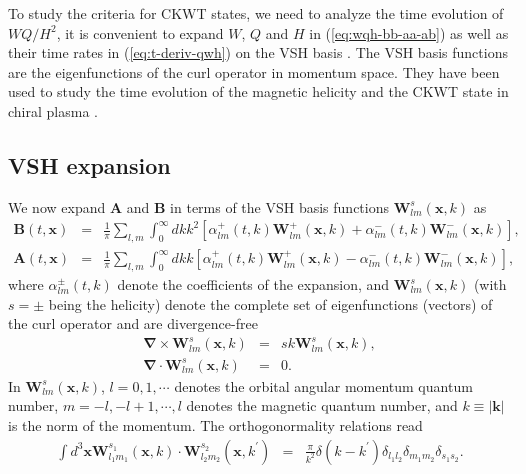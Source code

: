 \documentclass[english,aps,superscriptaddress,preprint]{revtex4-1}
\begin{document}
\label{sec:Methods}To study the criteria for CKWT states, we need
to analyze the time evolution of $WQ/H^{2}$, it is convenient to
expand $W$, $Q$ and $H$ in (\ref{eq:wqh-bb-aa-ab}) as well as
their time rates in (\ref{eq:t-deriv-qwh}) on the VSH basis \citep{Jackson1999}.
The VSH basis functions are the eigenfunctions of the curl operator
in momentum space. They have been used to study the time evolution
of the magnetic helicity and the CKWT state in chiral plasma \citep{Hirono:2015rla,Xia:2016any}.

\subsection{VSH expansion}

We now expand $\boldsymbol{A}$ and $\boldsymbol{B}$ in terms of
the VSH basis functions $\boldsymbol{W}_{lm}^{s}(\boldsymbol{x},k)$
as 
\begin{eqnarray}
\boldsymbol{B}(t,\boldsymbol{x}) & = & \frac{1}{\pi}\sum_{l,m}\int_{0}^{\infty}dkk^{2}\left[\alpha_{lm}^{+}(t,k)\boldsymbol{W}_{lm}^{+}(\boldsymbol{x},k)+\alpha_{lm}^{-}(t,k)\boldsymbol{W}_{lm}^{-}(\boldsymbol{x},k)\right],\nonumber \\
\boldsymbol{A}(t,\boldsymbol{x}) & = & \frac{1}{\pi}\sum_{l,m}\int_{0}^{\infty}dkk\left[\alpha_{lm}^{+}(t,k)\boldsymbol{W}_{lm}^{+}(\boldsymbol{x},k)-\alpha_{lm}^{-}(t,k)\boldsymbol{W}_{lm}^{-}(\boldsymbol{x},k)\right],\label{eq:VSH-expansion}
\end{eqnarray}
where $\alpha_{lm}^{\pm}(t,k)$ denote the coefficients of the expansion,
and $\boldsymbol{W}_{lm}^{s}(\boldsymbol{x},k)$ (with $s=\pm$ being
the helicity) denote the complete set of eigenfunctions (vectors)
of the curl operator and are divergence-free 
\begin{eqnarray}
\boldsymbol{\nabla}\times\boldsymbol{W}_{lm}^{s}(\boldsymbol{x},k) & = & sk\boldsymbol{W}_{lm}^{s}(\boldsymbol{x},k),\nonumber \\
\boldsymbol{\nabla}\cdot\boldsymbol{W}_{lm}^{s}(\boldsymbol{x},k) & = & 0.\label{eq:curl-w}
\end{eqnarray}
In $\boldsymbol{W}_{lm}^{s}(\boldsymbol{x},k)$, $l=0,1,\cdots$ denotes
the orbital angular momentum quantum number, $m=-l,-l+1,\cdots,l$
denotes the magnetic quantum number, and $k\equiv|\boldsymbol{k}|$
is the norm of the momentum. The orthogonormality relations read 
\begin{eqnarray}
\int d^{3}\boldsymbol{x}\boldsymbol{W}_{l_{1}m_{1}}^{s_{1}}(\boldsymbol{x},k)\cdot\boldsymbol{W}_{l_{2}m_{2}}^{s_{2}}(\boldsymbol{x},k^{\prime}) & = & \frac{\pi}{k^{2}}\delta\left(k-k^{\prime}\right)\delta_{l_{1}l_{2}}\delta_{m_{1}m_{2}}\delta_{s_{1}s_{2}}.\label{eq:VSH orthorgonal}
\end{eqnarray}
\end{document}
